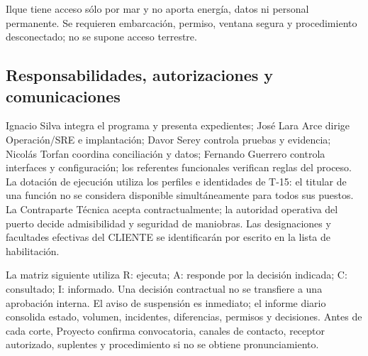 Ilque tiene acceso sólo por mar y no aporta energía, datos ni personal permanente. Se requieren embarcación, permiso, ventana segura y procedimiento desconectado; no se supone acceso terrestre.


\subsection{Responsabilidades, autorizaciones y comunicaciones}
Ignacio Silva integra el programa y presenta expedientes; José Lara Arce dirige Operación/SRE e implantación; Davor Serey controla pruebas y evidencia; Nicolás Torfan coordina conciliación y datos; Fernando Guerrero controla interfaces y configuración; los referentes funcionales verifican reglas del proceso. La dotación de ejecución utiliza los perfiles e identidades de T-15: el titular de una función no se considera disponible simultáneamente para todos sus puestos. La Contraparte Técnica acepta contractualmente; la autoridad operativa del puerto decide admisibilidad y seguridad de maniobras. Las designaciones y facultades efectivas del CLIENTE se identificarán por escrito en la lista de habilitación.

La matriz siguiente utiliza R: ejecuta; A: responde por la decisión indicada; C: consultado; I: informado. Una decisión contractual no se transfiere a una aprobación interna. El aviso de suspensión es inmediato; el informe diario consolida estado, volumen, incidentes, diferencias, permisos y decisiones. Antes de cada corte, Proyecto confirma convocatoria, canales de contacto, receptor autorizado, suplentes y procedimiento si no se obtiene pronunciamiento.

